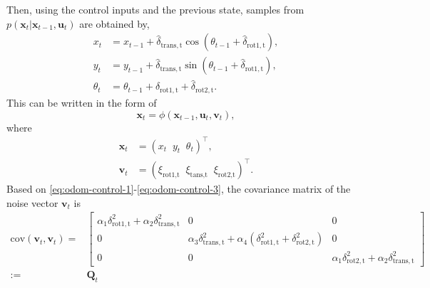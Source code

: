 Then, using the control inputs and the previous state, samples from $p(\mathbf{x}_t | \mathbf{x}_{t-1},\mathbf{u}_t)$
are obtained by,
\begin{align}
    x_t      & = x_{t-1} + \hat{\delta}_{\mathrm{trans,t}}\cos(\theta_{t-1} + \hat{\delta}_{\mathrm{rot1,t}}), \\
    y_t      & = y_{t-1} + \hat{\delta}_{\mathrm{trans,t}}\sin(\theta_{t-1} + \hat{\delta}_{\mathrm{rot1,t}}), \\
    \theta_t & = \theta_{t-1} + \hat{\delta}_{\mathrm{rot1,t}} + \hat{\delta}_{\mathrm{rot2,t}}.
\end{align}
This can be written in the form of
\begin{equation}
    \mathbf{x}_t = \phi(\mathbf{x}_{t-1},\mathbf{u}_t,\mathbf{v}_t),
\end{equation}
where
\begin{align}
    \mathbf{x}_t & = (x_t\;\;y_t\;\;\theta_t)^{\top},                                            \\
    \mathbf{v}_t & = (\xi_{\text{rot1,t}}\;\;\xi_{\text{tans,t}}\;\;\xi_{\text{rot2,t}})^{\top}.
\end{align}
Based on \eqref{eq:odom-control-1}-\eqref{eq:odom-control-3}, the covariance matrix of the noise
vector $\mathbf{v}_t$ is
\begin{align}
    \text{cov}(\mathbf{v}_t,\mathbf{v}_t) = &
    \begin{bmatrix}
        \alpha_1\delta_{\mathrm{rot1,t}}^2+\alpha_2\delta_{\mathrm{trans,t}}^2 & 0                                                                                                   & 0                                                                      \\
        0                                                                      & \alpha_3\delta_{\mathrm{trans,t}}^2+\alpha_4(\delta_{\mathrm{rot1,t}}^2+\delta_{\mathrm{rot2,t}}^2) & 0                                                                      \\
        0                                                                      & 0                                                                                                   & \alpha_1\delta_{\mathrm{rot2,t}}^2+\alpha_2\delta_{\mathrm{trans,t}}^2
    \end{bmatrix}                                       \nonumber \\
    :=                                      & \mathbf{Q}_t
\end{align}
